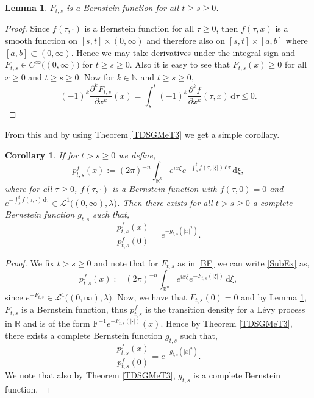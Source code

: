 \documentclass[a4paper, 12pt]{report}
\newtheorem{lemma}[theorem]{Lemma}
\newtheorem{cor}[theorem]{Corollary}
\theoremstyle{cor}
\theoremstyle{remark}
\theoremstyle{definition}
\begin{document}
\begin{lemma}\label{TDSGMeL1}
$F_{t, s}$ is a Bernstein function for all $t \ge s \ge 0$.
\end{lemma}
\begin{proof}
Since $f(\tau, \cdot)$ is a Bernstein function for all $\tau \ge 0$, then $f(\tau, x)$ is a smooth function on $[s, t] \times (0, \infty)$ and therefore also on $[s, t] \times [a, b]$ where $[a, b] \subset (0, \infty)$.  Hence we may take derivatives under the integral sign and $F_{t, s} \in C^\infty\big((0, \infty)\big)$ for $t \ge s \ge 0$.  Also it is easy to see that $F_{t, s}(x) \ge 0$ for all $x \ge 0$ and $t \ge s \ge 0$.  Now for $k \in \mathbb{N}$ and $t \ge s \ge 0$,
$$
(-1)^k\frac{\partial^kF_{t, s}}{\partial x^k}(x) = \int_s^t(-1)^k\frac{\partial^kf}{\partial x^k}(\tau, x)\,\mathrm{d}\tau \le 0.
$$
\end{proof}

From this and by using Theorem \ref{TDSGMeT3} we get a simple corollary.
\begin{cor}\label{TDSGMetcC1}
If for $t > s \ge 0$ we define,
\begin{equation}
p_{t, s}^f(x) := (2\pi)^{-n}\int_{\mathbb{R}^n}e^{ix\xi}e^{-\int_s^tf(\tau, |\xi|)\,\mathrm{d}\tau}\,\mathrm{d}\xi,\label{SubEx}
\end{equation}
where for all $\tau \ge 0$, $f(\tau, \cdot)$ is a Bernstein function with $f(\tau, 0) = 0$ and $e^{-\int_s^tf(\tau, \cdot)\,\mathrm{d}\tau} \in \mathcal{L}^1\big((0, \infty), \lambda\big)$.  Then there exists for all $t > s \ge 0$ a complete Bernstein function $g_{t, s}$ such that,
$$
\frac{p_{t, s}^f(x)}{p_{t, s}^f(0)} = e^{-g_{t, s}(|x|^2)}.
$$
\end{cor}
\begin{proof}
We fix $t > s \ge 0$ and note that for $F_{t, s}$ as in \eqref{BF} we can write \eqref{SubEx} as,
$$
p_{t, s}^f(x) := (2\pi)^{-n}\int_{\mathbb{R}^n}e^{ix\xi}e^{-F_{t, s}(|\xi|)}\,\mathrm{d}\xi,
$$
since $e^{-F_{t, s}} \in \mathcal{L}^1\big((0, \infty), \lambda\big)$.  Now, we have that $F_{t, s}(0) = 0$ and by Lemma \ref{TDSGMeL1}, $F_{t, s}$ is a Bernstein function, thus $p_{t, s}^f$ is the transition density for a L\'evy process in $\mathbb{R}$ and is of the form $\mathrm{F}^{-1}e^{-F_{t, s}(|\cdot|)}(x)$.  Hence by Theorem \ref{TDSGMeT3}, there exists a complete Bernstein function $g_{t, s}$ such that,
$$
\frac{p_{t, s}^f(x)}{p_{t, s}^f(0)} = e^{-g_{t, s}(|x|^2)}.
$$
We note that also by Theorem \ref{TDSGMeT3}, $g_{t, s}$ is a complete Bernstein function.
\end{proof}
\end{document}
